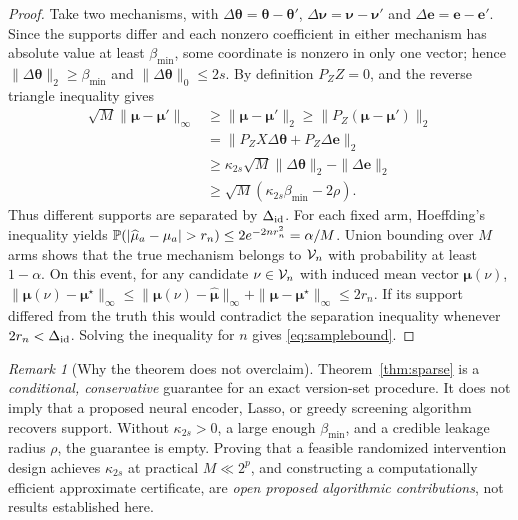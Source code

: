 \documentclass[11pt,a4paper]{article}
\theoremstyle{definition}\newtheorem{definition}[theorem]{Definition}
\theoremstyle{remark}\newtheorem{remark}[theorem]{Remark}
\begin{document}
\begin{proof}
Take two mechanisms, with $\Delta\bm\theta=\bm\theta-\bm\theta'$, $\Delta\bm\nu=\bm\nu-\bm\nu'$ and $\Delta\bm e=\bm e-\bm e'$. Since the supports differ and each nonzero coefficient in either mechanism has absolute value at least $\beta_{\min}$, some coordinate is nonzero in only one vector; hence $\|\Delta\bm\theta\|_2\ge\beta_{\min}$ and $\|\Delta\bm\theta\|_0\le2s$. By definition $P_ZZ=0$, and the reverse triangle inequality gives
\begin{align*}
 \sqrt M\|\bm\mu-\bm\mu'\|_\infty
 &\ge \|\bm\mu-\bm\mu'\|_2\ge\|P_Z(\bm\mu-\bm\mu')\|_2\\
 &=\|P_Z X\Delta\bm\theta+P_Z\Delta\bm e\|_2\\
 &\ge\kappa_{2s}\sqrt M\|\Delta\bm\theta\|_2-\|\Delta\bm e\|_2\\
 &\ge\sqrt M(\kappa_{2s}\beta_{\min}-2\rho).
\end{align*}
Thus different supports are separated by $\Delta_{\rm id}$. For each fixed arm, Hoeffding's inequality yields $\Prb(|\widehat\mu_a-\mu_a|>r_n)\le 2e^{-2nr_n^2}=\alpha/M$. Union bounding over $M$ arms shows that the true mechanism belongs to $\mathcal{V}_n$ with probability at least $1-\alpha$. On this event, for any candidate $\nu\in\mathcal{V}_n$ with induced mean vector $\bm\mu(\nu)$,
$\|\bm\mu(\nu)-\bm\mu^\star\|_\infty\le\|\bm\mu(\nu)-\widehat{\bm\mu}\|_\infty+\|\widehat{\bm\mu}-\bm\mu^\star\|_\infty\le2r_n$. If its support differed from the truth this would contradict the separation inequality whenever $2r_n<\Delta_{\rm id}$. Solving the inequality for $n$ gives \cref{eq:samplebound}.\qedhere
\end{proof}
\begin{remark}[Why the theorem does not overclaim]
Theorem~\ref{thm:sparse} is a \emph{conditional, conservative} guarantee for an exact version-set procedure. It does not imply that a proposed neural encoder, Lasso, or greedy screening algorithm recovers support. Without $\kappa_{2s}>0$, a large enough $\beta_{\min}$, and a credible leakage radius $\rho$, the guarantee is empty. Proving that a feasible randomized intervention design achieves $\kappa_{2s}$ at practical $M\ll2^p$, and constructing a computationally efficient approximate certificate, are \emph{open proposed algorithmic contributions}, not results established here.
\end{remark}
\end{document}
